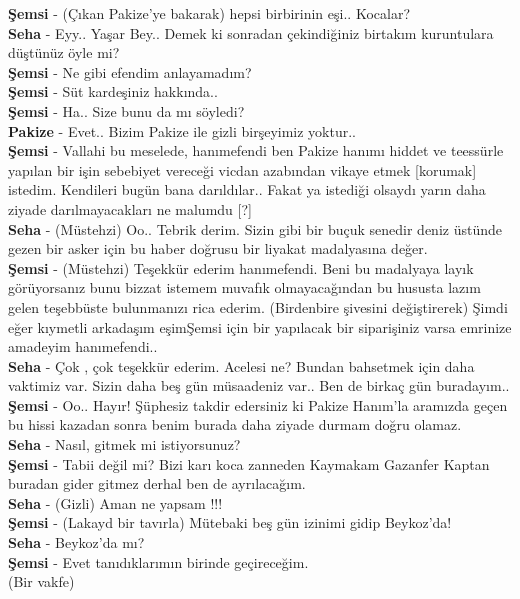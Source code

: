 \documentclass[]{book}
\begin{document}
\textbf{Şemsi} - (Çıkan Pakize'ye bakarak) hepsi birbirinin eşi.. Kocalar?\\
\textbf{Seha} - Eyy.. Yaşar Bey.. Demek ki sonradan çekindiğiniz birtakım kuruntulara düştünüz öyle mi?\\
\textbf{Şemsi} - Ne gibi efendim anlayamadım?\\
\textbf{Şemsi} - Süt kardeşiniz hakkında..\\
\textbf{Şemsi} - Ha.. Size bunu da mı söyledi?\\
\textbf{Pakize} - Evet.. Bizim Pakize ile gizli birşeyimiz yoktur..\\
\textbf{Şemsi} - Vallahi bu meselede, hanımefendi ben Pakize hanımı hiddet ve teessürle yapılan bir işin sebebiyet vereceği vicdan azabından vikaye etmek {[}korumak{]} istedim. Kendileri bugün bana darıldılar.. Fakat ya istediği olsaydı yarın daha ziyade darılmayacakları ne malumdu {[}?{]}\\
\textbf{Seha} - (Müstehzi) Oo.. Tebrik derim. Sizin gibi bir buçuk senedir deniz üstünde gezen bir asker için bu haber doğrusu bir liyakat madalyasına değer.\\
\textbf{Şemsi} - (Müstehzi) Teşekkür ederim hanımefendi. Beni bu madalyaya layık görüyorsanız bunu
bizzat istemem muvafık olmayacağından bu hususta lazım gelen teşebbüste bulunmanızı rica ederim. (Birdenbire şivesini değiştirerek) Şimdi eğer kıymetli arkadaşım eşimŞemsi için bir yapılacak bir siparişiniz varsa emrinize amadeyim hanımefendi..\\
\textbf{Seha} - Çok , çok teşekkür ederim. Acelesi ne? Bundan bahsetmek için daha vaktimiz var. Sizin daha beş gün müsaadeniz var.. Ben de birkaç gün buradayım..\\
\textbf{Şemsi} - Oo.. Hayır! Şüphesiz takdir edersiniz ki Pakize Hanım'la aramızda geçen bu hissi kazadan sonra benim burada daha ziyade durmam doğru olamaz.\\
\textbf{Seha} - Nasıl, gitmek mi istiyorsunuz?\\
\textbf{Şemsi} - Tabii değil mi? Bizi karı koca zanneden Kaymakam Gazanfer Kaptan buradan gider gitmez derhal ben de ayrılacağım.\\
\textbf{Seha} - (Gizli) Aman ne yapsam !!!\\
\textbf{Şemsi} - (Lakayd bir tavırla) Mütebaki beş gün izinimi gidip Beykoz'da!\\
\textbf{Seha} - Beykoz'da mı?\\
\textbf{Şemsi} - Evet tanıdıklarımın birinde geçireceğim.\\
(Bir vakfe)
\end{document}
